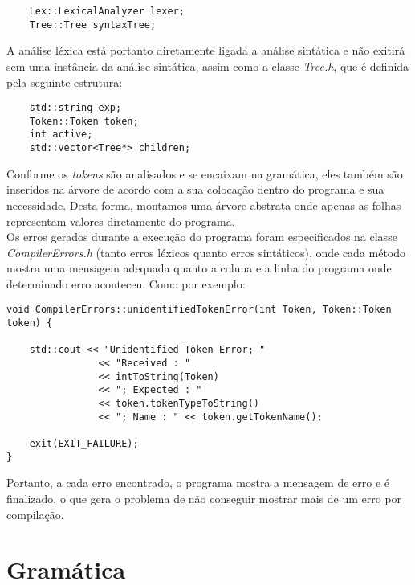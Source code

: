 \documentclass[12pt,a4paper,final]{article}
\begin{document}
\begin{lstlisting}
	Lex::LexicalAnalyzer lexer;
	Tree::Tree syntaxTree;
\end{lstlisting}

A análise léxica está portanto diretamente ligada a análise sintática e não exitirá sem uma instância da análise sintática, assim como a classe \textit{Tree.h}, que é definida pela seguinte estrutura:

\begin{lstlisting}
	std::string exp;
	Token::Token token;
	int active;
	std::vector<Tree*> children;
\end{lstlisting}

Conforme os \textit{tokens} são analisados e se encaixam na gramática, eles também são inseridos na árvore de acordo com a sua colocação dentro do programa e sua necessidade. Desta forma, montamos uma árvore abstrata onde apenas as folhas representam valores diretamente do programa.\\

Os erros gerados durante a execução do programa foram especificados na classe \textit{CompilerErrors.h} (tanto erros léxicos quanto erros sintáticos), onde cada método mostra uma mensagem adequada quanto a coluna e a linha do programa onde determinado erro aconteceu. Como por exemplo:

\begin{lstlisting}
void CompilerErrors::unidentifiedTokenError(int Token, Token::Token token) {

	std::cout << "Unidentified Token Error; "
				<< "Received : "
                << intToString(Token)
                << "; Expected : "
                << token.tokenTypeToString()
                << "; Name : " << token.getTokenName();
                
	exit(EXIT_FAILURE);
}
\end{lstlisting}

Portanto, a cada erro encontrado, o programa mostra a mensagem de erro e é finalizado, o que gera o problema de não conseguir mostrar mais de um erro por compilação.

\section*{Gramática}
\end{document}
